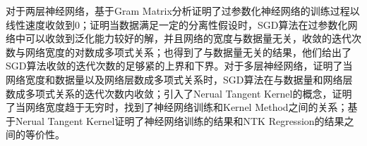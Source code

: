 \par
对于两层神经网络，\citet{du2018gradient}基于Gram Matrix分析证明了过参数化神经网络的训练过程以线性速度收敛到0；\citet{li2018learning}证明当数据满足一定的分离性假设时，SGD算法在过参数化网络中可以收敛到泛化能力较好的解，并且网络的宽度与数据量无关，收敛的迭代次数与网络宽度的对数成多项式关系；\citet{brutzkus2017sgd}也得到了与数据量无关的结果，他们给出了SGD算法收敛的迭代次数的足够紧的上界和下界。对于多层神经网络，\citet{allen2018convergence}证明了当网络宽度和数据量以及网络层数成多项式关系时，SGD算法在与数据量和网络层数成多项式关系的迭代次数内收敛；\citet{jacot2018neural}引入了Nerual Tangent Kernel的概念，证明了当网络宽度趋于无穷时，找到了神经网络训练和Kernel Method之间的关系；\citet{arora2019exact}基于Nerual Tangent Kernel证明了神经网络训练的结果和NTK Regression的结果之间的等价性。

